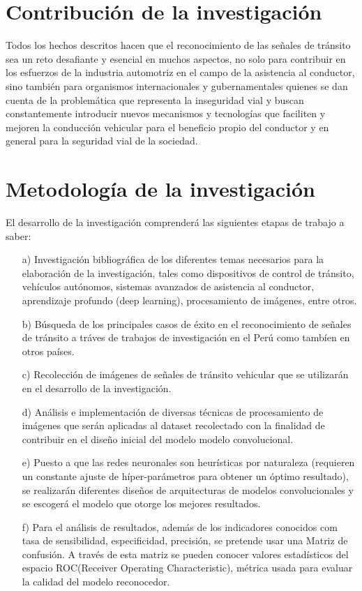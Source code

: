 \section{Contribución de la investigación}
	
	Todos los hechos descritos hacen que el reconocimiento de las señales de tránsito sea un reto desafiante y esencial en muchos aspectos, no solo para contribuir en los esfuerzos de la industria automotriz en el campo de la asistencia al conductor, sino también para organismos internacionales y gubernamentales quienes se dan cuenta de la problemática que representa la inseguridad vial y buscan constantemente introducir nuevos mecanismos y tecnologías que faciliten y mejoren la conducción vehicular para el beneficio propio del conductor y en general para la seguridad vial de la sociedad.


\section{Metodología de la investigación}
		El desarrollo de la investigación comprenderá las siguientes etapas de trabajo a saber:

		\begin{enumerate}

		\item[a)]	Investigación bibliográfica de los diferentes temas necesarios para la elaboración de la investigación, tales como dispositivos de control de tránsito, vehículos autónomos, sistemas avanzados de asistencia al conductor, aprendizaje profundo (deep learning), procesamiento de imágenes, entre otros.
		
		\item[b)]	Búsqueda de los principales casos de éxito en el reconocimiento de señales de tránsito a tráves de trabajos de investigación en el Perú como tambíen en otros países.

		\item[c)]	Recolección de imágenes de señales de tránsito vehicular que se utilizarán en el desarrollo de la investigación.

		\item[d)]	Análisis e implementación de diversas técnicas de procesamiento de imágenes que serán aplicadas al dataset recolectado con la finalidad de contribuir en el diseño inicial del modelo modelo convolucional.

		\item[e)]	Puesto a que las redes neuronales son heurísticas por naturaleza (requieren un constante ajuste de híper-parámetros para obtener un óptimo resultado), se realizarán diferentes diseños de arquitecturas de modelos convolucionales y se escogerá el modelo que otorge los mejores resultados.
		
		\item[f)]	Para el análisis de resultados, además de los indicadores conocidos com tasa de sensibilidad, especificidad, precisión, se pretende usar una Matriz de confusión. A través de esta matriz se pueden conocer valores estadísticos del espacio ROC(Receiver Operating Characteristic), métrica usada para evaluar la calidad del modelo reconocedor.
		
		\end{enumerate}

